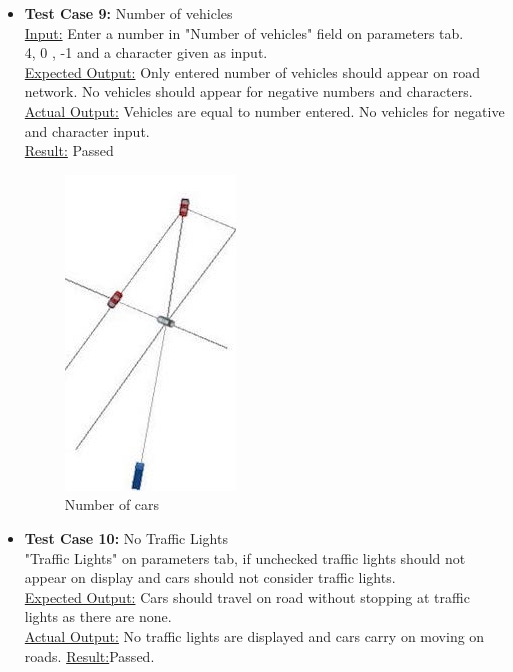 \documentclass[11pt]{article}
\begin{document}
\begin{enumerate}
\begin{itemize}
\begin{itemize}
		
		\item\textbf{Test Case 9:} Number of vehicles\hfill \\
		\underline{Input:} Enter a number in "Number of vehicles" field on parameters tab.\hfill \\
		4, 0 , -1 and a character given as input.\hfill \\
		\underline{Expected Output:} Only entered number of vehicles should appear on road network. No vehicles should appear for negative numbers and characters. \hfill \\
		\underline{Actual Output:}  Vehicles are equal to number entered. No vehicles for negative and character input.\hfil \\
		\underline{Result:} Passed\hfil \\
		\begin{figure}[h]
		\begin{center}
		\includegraphics[scale=0.8]{4cars}
		\caption{Number of cars}
		\end{center}
		\end{figure}
		
		\item \textbf{Test Case 10:} No Traffic Lights\hfill \\
		"Traffic Lights" on parameters tab, if unchecked traffic lights should not appear on display and cars should not consider traffic lights.\hfill \\
		\underline{Expected Output:} Cars should travel on road without stopping at traffic lights as there are none.\hfill \\
		\underline{Actual Output:} No traffic lights are displayed and cars carry on moving on roads.
		\underline{Result:}Passed.
		

\end{itemize}
\end{itemize}
\end{enumerate}
\end{document}
